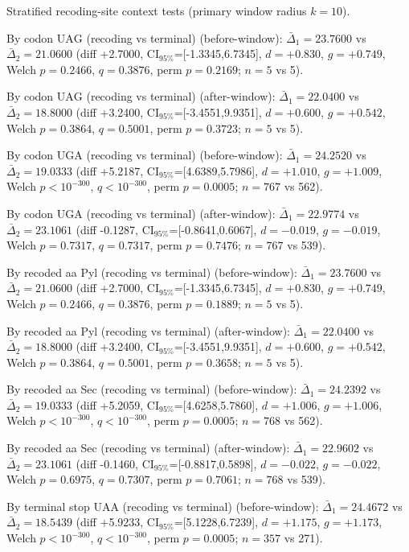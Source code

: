 Stratified recoding-site context tests (primary window radius $k=10$).

By codon $\mathrm{UAG}$ (recoding vs terminal) (before-window): $\bar{\Delta}_1=23.7600$ vs $\bar{\Delta}_2=21.0600$ (diff +2.7000, CI$_{95\%}$=[-1.3345,6.7345], $d=+0.830$, $g=+0.749$, Welch $p=0.2466$, $q=0.3876$, perm $p=0.2169$; $n=5$ vs 5).

By codon $\mathrm{UAG}$ (recoding vs terminal) (after-window): $\bar{\Delta}_1=22.0400$ vs $\bar{\Delta}_2=18.8000$ (diff +3.2400, CI$_{95\%}$=[-3.4551,9.9351], $d=+0.600$, $g=+0.542$, Welch $p=0.3864$, $q=0.5001$, perm $p=0.3723$; $n=5$ vs 5).

By codon $\mathrm{UGA}$ (recoding vs terminal) (before-window): $\bar{\Delta}_1=24.2520$ vs $\bar{\Delta}_2=19.0333$ (diff +5.2187, CI$_{95\%}$=[4.6389,5.7986], $d=+1.010$, $g=+1.009$, Welch $p<10^{-300}$, $q<10^{-300}$, perm $p=0.0005$; $n=767$ vs 562).

By codon $\mathrm{UGA}$ (recoding vs terminal) (after-window): $\bar{\Delta}_1=22.9774$ vs $\bar{\Delta}_2=23.1061$ (diff -0.1287, CI$_{95\%}$=[-0.8641,0.6067], $d=-0.019$, $g=-0.019$, Welch $p=0.7317$, $q=0.7317$, perm $p=0.7476$; $n=767$ vs 539).

By recoded aa Pyl (recoding vs terminal) (before-window): $\bar{\Delta}_1=23.7600$ vs $\bar{\Delta}_2=21.0600$ (diff +2.7000, CI$_{95\%}$=[-1.3345,6.7345], $d=+0.830$, $g=+0.749$, Welch $p=0.2466$, $q=0.3876$, perm $p=0.1889$; $n=5$ vs 5).

By recoded aa Pyl (recoding vs terminal) (after-window): $\bar{\Delta}_1=22.0400$ vs $\bar{\Delta}_2=18.8000$ (diff +3.2400, CI$_{95\%}$=[-3.4551,9.9351], $d=+0.600$, $g=+0.542$, Welch $p=0.3864$, $q=0.5001$, perm $p=0.3658$; $n=5$ vs 5).

By recoded aa Sec (recoding vs terminal) (before-window): $\bar{\Delta}_1=24.2392$ vs $\bar{\Delta}_2=19.0333$ (diff +5.2059, CI$_{95\%}$=[4.6258,5.7860], $d=+1.006$, $g=+1.006$, Welch $p<10^{-300}$, $q<10^{-300}$, perm $p=0.0005$; $n=768$ vs 562).

By recoded aa Sec (recoding vs terminal) (after-window): $\bar{\Delta}_1=22.9602$ vs $\bar{\Delta}_2=23.1061$ (diff -0.1460, CI$_{95\%}$=[-0.8817,0.5898], $d=-0.022$, $g=-0.022$, Welch $p=0.6975$, $q=0.7307$, perm $p=0.7061$; $n=768$ vs 539).

By terminal stop $\mathrm{UAA}$ (recoding vs terminal) (before-window): $\bar{\Delta}_1=24.4672$ vs $\bar{\Delta}_2=18.5439$ (diff +5.9233, CI$_{95\%}$=[5.1228,6.7239], $d=+1.175$, $g=+1.173$, Welch $p<10^{-300}$, $q<10^{-300}$, perm $p=0.0005$; $n=357$ vs 271).

